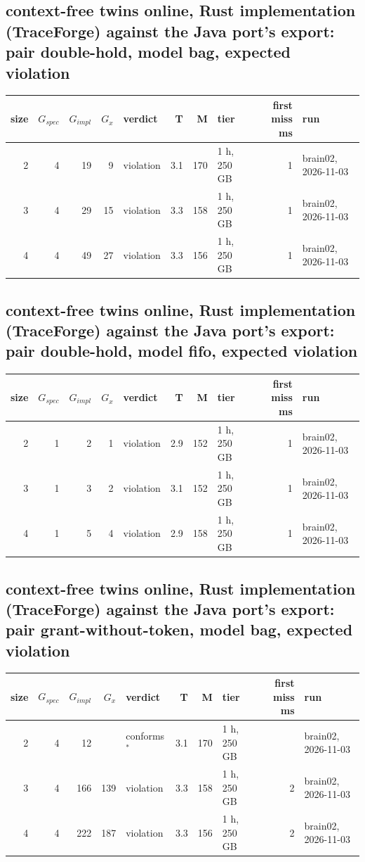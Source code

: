 \documentclass[10pt]{article}
\begin{document}
\subsection*{context-free twins online, Rust implementation (TraceForge) against the Java port's export: pair \textsf{double-hold}, model bag, expected violation}
\begin{longtable}{@{}rrrrlrrlrl@{}}
\toprule
size & $G_{\mathit{spec}}$ & $G_{\mathit{impl}}$ & $G_x$ & verdict & T & M & tier & first miss ms & run \\
\midrule
\endhead
\color{red} 2 & 4 & 19 & 9 & violation & 3.1 & 170 & 1 h, 250 GB & 1 & brain02, 2026-11-03 \\
\color{red} 3 & 4 & 29 & 15 & violation & 3.3 & 158 & 1 h, 250 GB & 1 & brain02, 2026-11-03 \\
\color{red} 4 & 4 & 49 & 27 & violation & 3.3 & 156 & 1 h, 250 GB & 1 & brain02, 2026-11-03 \\
\bottomrule
\end{longtable}
\subsection*{context-free twins online, Rust implementation (TraceForge) against the Java port's export: pair \textsf{double-hold}, model fifo, expected violation}
\begin{longtable}{@{}rrrrlrrlrl@{}}
\toprule
size & $G_{\mathit{spec}}$ & $G_{\mathit{impl}}$ & $G_x$ & verdict & T & M & tier & first miss ms & run \\
\midrule
\endhead
\color{red} 2 & 1 & 2 & 1 & violation & 2.9 & 152 & 1 h, 250 GB & 1 & brain02, 2026-11-03 \\
\color{red} 3 & 1 & 3 & 2 & violation & 3.1 & 152 & 1 h, 250 GB & 1 & brain02, 2026-11-03 \\
\color{red} 4 & 1 & 5 & 4 & violation & 2.9 & 158 & 1 h, 250 GB & 1 & brain02, 2026-11-03 \\
\bottomrule
\end{longtable}
\subsection*{context-free twins online, Rust implementation (TraceForge) against the Java port's export: pair \textsf{grant-without-token}, model bag, expected violation}
\begin{longtable}{@{}rrrrlrrlrl@{}}
\toprule
size & $G_{\mathit{spec}}$ & $G_{\mathit{impl}}$ & $G_x$ & verdict & T & M & tier & first miss ms & run \\
\midrule
\endhead
\color{red} 2 & 4 & 12 &  & conforms$^{\ast}$ & 3.1 & 170 & 1 h, 250 GB &  & brain02, 2026-11-03 \\
\color{red} 3 & 4 & 166 & 139 & violation & 3.3 & 158 & 1 h, 250 GB & 2 & brain02, 2026-11-03 \\
\color{red} 4 & 4 & 222 & 187 & violation & 3.3 & 156 & 1 h, 250 GB & 2 & brain02, 2026-11-03 \\
\bottomrule
\end{longtable}
\end{document}
